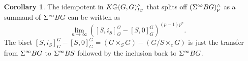 \documentclass[10pt]{amsart}
\theoremstyle{definition}
\newtheorem{corollary}[theorem]{Corollary}
\begin{document}
\begin{comment}
The equalities are true in great generality. Let $A$ be a complete local $\Z_p$-algebra with maximal ideal $m \subset A$ such that $A/m \cong \F_p$. Assume further that $A$ is finitely generated as a $\Z_p$-module, then an element $X \in A$ is invertible if and only if
\[
X \neq 0  \mod m
\]
and then we have the formulas
\[
X^{-1} = X^{p-2}\sum_{i \geq 0} (1-X^{p-1})^{i} = \lim_{n \to \infty} X^{(p-1)p^n-1}.
\]
The limit is taken in the topology induced by the fact that $A$ is $p$-complete. It is enough to show that
\[
\lim_{n \to \infty} X^{(p-1)p^n}= X \times \lim_{n \to \infty} X^{(p-1)p^n-1} = 1.
\]
But since $A/m \cong \F_p$, we have that $X^{p-1} = 1 \mod m$. Thus it is enough to show that if $Y=1 \mod m$, then $\lim Y^{p^n}=1$. First we prove the convergence in the $m$-adic topology. Indeed, we will prove by induction that
\[
Y^{p^n}-1 \in m^{n+1}.
\]
The case $n=0$ follows by assumption. Assume that $Y^{p^n}-1 \in m^{n+1}$. We have
\[
Y^{p^{n+1}}-1  = (Y^{p^n}-1)(\sum^{p-1}_{i=0} Y^{p^ni})
\]
but
\[
\sum^{p-1}_{i=0} Y^{p^ni} = \sum^{p-1}_{i=0} 1^{p^ni} =p =0 \mod m.
\]
and $(Y^{p^n}-1)\in m^{n+1}$ by assumption.

We have reduced to showing that the $p$-adic topology and $m$-adic coincide. We clearly have $(p) < (m)$. So is enough to show that there is a $k$ such that $(m^k) \subset (p)$. Indeed $A/p$ is a finite dimensional local  $\F_p$ algebra and $m/p$ is it's maximal ideal. Thus by Jacobson-Azumaya-Nakyama it is nilpotent.
\end{comment}




\begin{corollary}\label{splittingIdempotent}
The idempotent in $K \mathbb{G}(G,G)^\wedge_{I_G}$ that splits off $(\Sigma^{\infty} BG)^\wedge_p$ as a summand of $\Sigma^{\infty} BG$ can be written as
\[
\lim_{n\to\infty} ([S,i_S]_G^G - [S,0]_G^G)^{(p-1)p^n}.
\]
The biset $[S,i_S]_G^G - [S,0]_G^G= (G\times_S G) - (G/S \times_{e} G)$ is just the transfer from $\Sigma^{\infty} BG$ to $\Sigma^{\infty} BS$ followed by the inclusion back to $\Sigma^{\infty} BG$.
\end{corollary}
\end{document}
